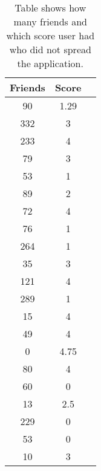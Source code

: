 \documentclass[preprint,12pt]{elsarticle}
\begin{document}
 \begin{center}
 \begin{table}
 \label{tab:nospread}
 \begin{tabular}{ c c c}
Friends & Score  \\
\hline
90 & 1.29 \\
332 & 3 \\
233 & 4 \\
79 & 3 \\
53 & 1 \\
89 & 2 \\
72 & 4 \\
76 & 1 \\
264 & 1 \\
35 & 3 \\
121 & 4 \\
289 & 1 \\
15 & 4 \\
49 & 4 \\
0 & 4.75 \\
80 & 4 \\
60 & 0 \\
13 & 2.5 \\
229 & 0 \\
53 & 0 \\
10 & 3 
\end{tabular}
\caption{Table shows how many friends and which score user had who did
  not spread the application.}
\end{table}
\end{center}
\end{document}
